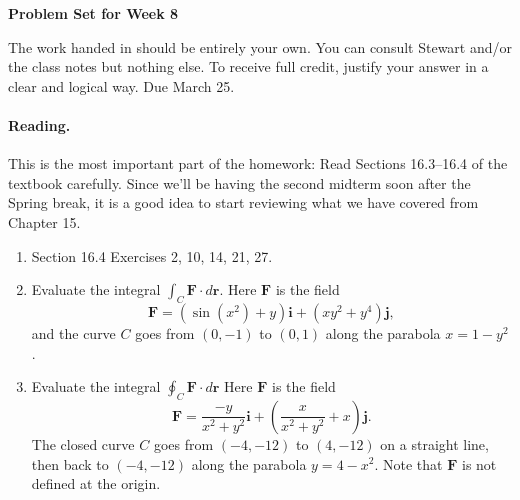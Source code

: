 \documentclass[11pt]{article}
\theoremstyle{plain}
\theoremstyle{definition}
\begin{document}
\begin{center}
{\Large \bf Problem Set for Week 8}
\end{center}
The work handed in should be entirely your own. You can consult Stewart and/or the class notes but nothing else. To receive full credit, justify your answer in a clear and logical way. Due March 25.

\paragraph{Reading.} This is the most important part of the homework: Read Sections 16.3--16.4 of the textbook carefully. Since we'll be having the second midterm soon after the Spring break, it is a good idea to start reviewing what we have covered from Chapter 15.


\begin{enumerate}
\item Section 16.4 Exercises 2, 10, 14, 21, 27.
\item Evaluate the integral
$\int_{C}\mathbf{F} \cdot d\mathbf{r}$.
Here $\mathbf{F}$ is the field
\[
\mathbf{F} =(\sin(x^2) + y)\mathbf{i} + (xy^2 + y^4)\mathbf{j},
\]
and the curve $C$ goes from $(0, -1)$ to $(0, 1)$ along the parabola $x = 1 - y^2$.
\item Evaluate the integral
$\oint_{C}\mathbf{F}\cdot  d\mathbf{r}$
Here $\mathbf{F}$ is the field
\[
\mathbf{F} = \frac{-y}{x^2 + y^2}
\mathbf{i} +(\frac{x}{x^2 + y^2}+ x)\mathbf{j}.
\]
The closed curve $C$ goes from $(-4, -12)$ to $(4, -12)$ on a straight line, then back to $(-4, -12)$ along
the parabola $y = 4 - x^2$.
Note that $\mathbf{F}$ is not defined at the origin.
\end{enumerate}
\end{document}
